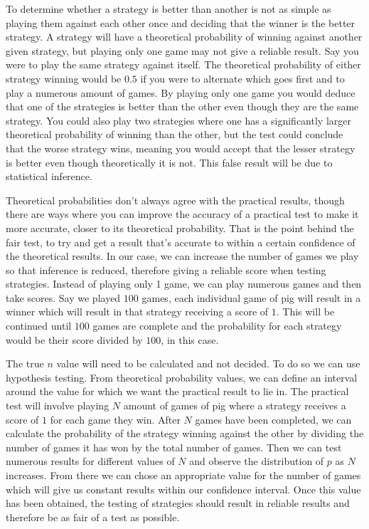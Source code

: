 \documentclass[a4paper,titlepage]{article}
\begin{document}
To determine whether a strategy is better than another is not as simple as playing them against each other once and deciding that the winner is the better strategy. A strategy will have a theoretical probability of winning against another given strategy, but playing only one game may not give a reliable result. Say you were to play the same strategy against itself. The theoretical probability of either strategy winning would be $0.5$ if you were to alternate which goes first and to play a numerous amount of games. By playing only one game you would deduce that one of the strategies is better than the other even though they are the same strategy. You could also play two strategies where one has a significantly larger theoretical probability of winning than the other, but the test could conclude that the worse strategy wins, meaning you would accept that the lesser strategy is better even though theoretically it is not. This false result will be due to statistical inference.

Theoretical probabilities don’t always agree with the practical results, though there are ways where you can improve the accuracy of a practical test to make it more accurate, closer to its theoretical probability. That is the point behind the fair test, to try and get a result that’s accurate to within a certain confidence of the theoretical results.  In our case, we can increase the number of games we play so that inference is reduced, therefore giving a reliable score when testing strategies. Instead of playing only 1 game, we can play numerous games and then take scores. Say we played $100$ games, each individual game of pig will result in a winner which will result in that strategy receiving a score of $1$. This will be continued until $100$ games are complete and the probability for each strategy would be their score divided by $100$, in this case.

The true $n$ value will need to be calculated and not decided. To do so we can use hypothesis testing. From theoretical probability values, we can define an interval around the value for which we want the practical result to lie in. The practical test will involve playing $N$ amount of games of pig where a strategy receives a score of $1$ for each game they win. After $N$ games have been completed, we can calculate the probability of the strategy winning against the other by dividing the number of games it has won by the total number of games. Then we can test numerous results for different values of $N$ and observe the distribution of $p$ as $N$ increases. From there we can chose an appropriate value for the number of games which will give us constant results within our confidence interval. Once this value has been obtained, the testing of strategies should result in reliable results and therefore be as fair of a test as possible.
\end{document}
